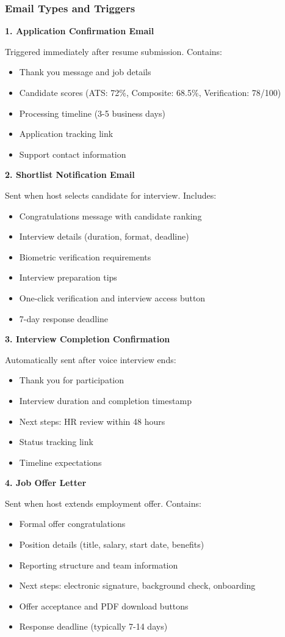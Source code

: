\documentclass[conference]{IEEEtran}
\begin{document}
\subsubsection{Email Types and Triggers}

\textbf{1. Application Confirmation Email}

Triggered immediately after resume submission. Contains:
\begin{itemize}
    \item Thank you message and job details
    \item Candidate scores (ATS: 72\%, Composite: 68.5\%, Verification: 78/100)
    \item Processing timeline (3-5 business days)
    \item Application tracking link
    \item Support contact information
\end{itemize}

\textbf{2. Shortlist Notification Email}

Sent when host selects candidate for interview. Includes:
\begin{itemize}
    \item Congratulations message with candidate ranking
    \item Interview details (duration, format, deadline)
    \item Biometric verification requirements
    \item Interview preparation tips
    \item One-click verification and interview access button
    \item 7-day response deadline
\end{itemize}

\textbf{3. Interview Completion Confirmation}

Automatically sent after voice interview ends:
\begin{itemize}
    \item Thank you for participation
    \item Interview duration and completion timestamp
    \item Next steps: HR review within 48 hours
    \item Status tracking link
    \item Timeline expectations
\end{itemize}

\textbf{4. Job Offer Letter}

Sent when host extends employment offer. Contains:
\begin{itemize}
    \item Formal offer congratulations
    \item Position details (title, salary, start date, benefits)
    \item Reporting structure and team information
    \item Next steps: electronic signature, background check, onboarding
    \item Offer acceptance and PDF download buttons
    \item Response deadline (typically 7-14 days)
\end{itemize}
\end{document}
